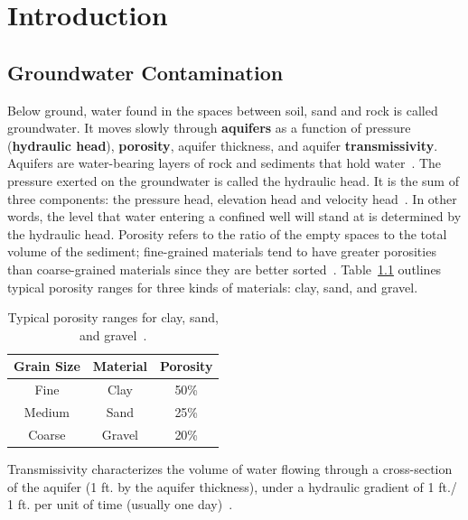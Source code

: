  \chapter{Introduction}
 \label{introchap}
\section{Groundwater Contamination}
Below ground, water found in the spaces between soil, sand and rock
is called groundwater. It moves slowly through
\textbf{aquifers} as a function of pressure (\textbf{hydraulic head}), \textbf{porosity},
aquifer thickness, and aquifer \textbf{transmissivity}. Aquifers are
water-bearing layers of rock and sediments that hold
water~\cite{basics}. The pressure exerted on the groundwater is called
the hydraulic head. It is the sum of three components: the pressure
head, elevation head and velocity head~\cite{basics}. In other words,
the level that water entering a confined well will stand at is
determined by the hydraulic head. Porosity refers to the ratio of the empty
spaces to the total volume of the sediment; fine-grained materials tend to
have greater porosities than coarse-grained materials since they are
better sorted~\cite{basics}. Table~\ref{tbl:porosity} outlines typical
porosity ranges for three kinds of materials: clay, sand, and gravel.
\begin {table}[H]
\caption [Typical porosity ranges for clay, sand, and gravel]{Typical
  porosity ranges for clay, sand, and gravel~\cite{basics}.} \label{tbl:porosity}
\begin{center}
    \begin{tabular}{ | c | c | c |}
    \hline
    Grain Size & Material & Porosity \\ \hline
    Fine & Clay  &  50\% \\ \hline
    Medium &  Sand & 25\% \\ \hline
    Coarse &  Gravel &  20\% \\ \hline
    \end{tabular}
\end{center}
\end{table}
\noindent Transmissivity characterizes the volume of water flowing through a
 cross-section of the aquifer (1 ft. by the aquifer thickness), under
 a hydraulic gradient of 1 ft./ 1 ft. per unit of time (usually one day)~\cite{basics}.

